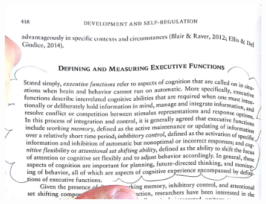 \documentclass{beamer}%
\begin{document}
\begin{frame}



    \begin{figure}
        \vspace{-0.2cm}  %
        \setlength{\belowcaptionskip}{-0.4cm}   %
        \setlength{\abovecaptionskip}{0.4cm}   %
        \centering%
        \hspace{0.05cm}\includegraphics[width=0.8\linewidth]{Distortions.jpg}\\
        \label{fig:fastdata}
    \end{figure}


\end{frame}
\end{document}
